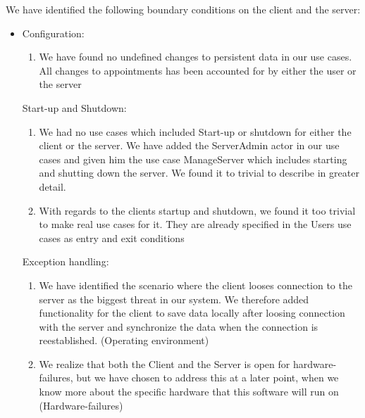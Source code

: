 We have identified the following boundary conditions on the client and the server:


\begin{itemize}
	\item Configuration:
	\begin{enumerate}
		\item We have found no undefined changes to persistent data in our use cases. All changes to appointments has been accounted for by either the user or the server
	\end{enumerate}
	\Item Start-up and Shutdown:
	\begin{enumerate}
		\item We had no use cases which included Start-up or shutdown for either the client or the server. We have added the ServerAdmin actor in our use cases and given him the use case ManageServer which includes starting and shutting down the server. We found it to trivial to describe in greater detail.
		\item With regards to the clients startup and shutdown, we found it too trivial to make real use cases for it. They are already specified in the Users use cases as entry and exit conditions
	\end{enumerate}
	\Item Exception handling:
	\begin{enumerate}
		\item We have identified the scenario where the client looses connection to the server as the biggest threat in our system. We therefore added functionality for the client to save data locally after loosing connection with the server and synchronize the data when the connection is reestablished. (Operating environment)
		\item We realize that both the Client and the Server is open for hardware-failures, but we have chosen to address this at a later point, when we know more about the specific hardware that this software will run on (Hardware-failures)
	\end{enumerate}
\end{itemize}